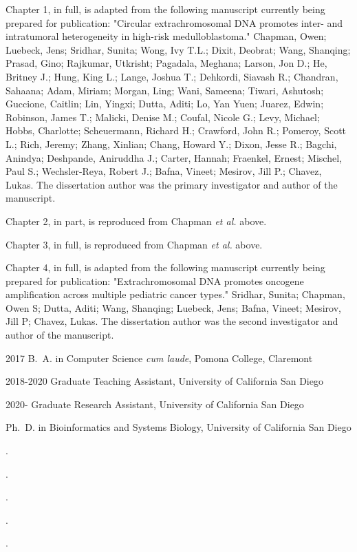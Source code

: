 \begin{frontmatter}
\begin{acknowledgements}
\par Chapter 1, in full, is adapted from the following manuscript currently being prepared for publication: "Circular extrachromosomal DNA promotes inter- and intratumoral heterogeneity in high-risk medulloblastoma." Chapman, Owen; Luebeck, Jens; Sridhar, Sunita; Wong, Ivy T.L.; Dixit, Deobrat; Wang, Shanqing; Prasad, Gino; Rajkumar, Utkrisht; Pagadala, Meghana; Larson, Jon D.; He, Britney J.; Hung, King L.; Lange, Joshua T.; Dehkordi, Siavash R.; Chandran, Sahaana; Adam, Miriam; Morgan, Ling; Wani, Sameena; Tiwari, Ashutosh; Guccione, Caitlin; Lin, Yingxi; Dutta, Aditi; Lo, Yan Yuen; Juarez, Edwin; Robinson, James T.; Malicki, Denise M.; Coufal, Nicole G.; Levy, Michael; Hobbs, Charlotte; Scheuermann, Richard H.; Crawford, John R.; Pomeroy, Scott L.; Rich, Jeremy; Zhang, Xinlian; Chang, Howard Y.; Dixon, Jesse R.; Bagchi, Anindya; Deshpande, Aniruddha J.; Carter, Hannah; Fraenkel, Ernest; Mischel, Paul S.; Wechsler-Reya, Robert J.; Bafna, Vineet; Mesirov, Jill P.; Chavez, Lukas. The dissertation author was the primary investigator and author of the manuscript.
\par Chapter 2, in part, is reproduced from Chapman \textit{et al.} above.
\par Chapter 3, in full, is reproduced from Chapman \textit{et al.} above.
\par Chapter 4, in full, is adapted from the following manuscript currently being prepared for publication: "Extrachromosomal DNA promotes oncogene amplification across multiple pediatric cancer types." Sridhar, Sunita; Chapman, Owen S; Dutta, Aditi; Wang, Shanqing; Luebeck, Jens; Bafna, Vineet; Mesirov, Jill P; Chavez, Lukas.
The dissertation author was the second investigator and author of the manuscript.
\end{acknowledgements}


%
%
\begin{vitapage}
\begin{vita}
  \item[2017] B.~A. in Computer Science \emph{cum laude}, Pomona College, Claremont
  \item[2018-2020] Graduate Teaching Assistant, University of California San Diego
  \item[2020-\the\year] Graduate Research Assistant, University of California San Diego
  \item[\the\year] Ph.~D. in Bioinformatics and Systems Biology, University of California San Diego
\end{vita}
\begin{publications}
  \item {}.
  \item {}.
  \item {}.
  \item {}.
  \item {}.
\end{publications}


\end{vitapage}
\end{frontmatter}
